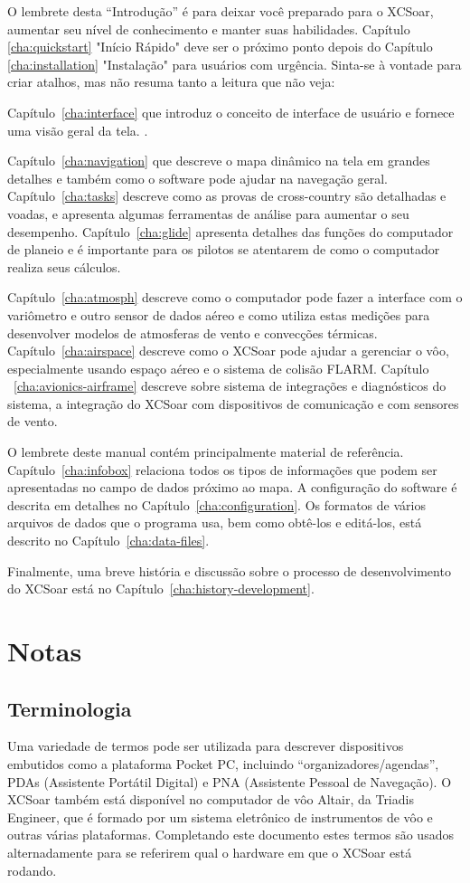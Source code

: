 O lembrete desta “Introdução” é para deixar você preparado para o XCSoar, aumentar seu nível de conhecimento e manter suas habilidades.   
Capítulo \ref{cha:quickstart} "Início Rápido" deve ser o próximo ponto depois do Capítulo 
\ref{cha:installation} "Instalação" para usuários com urgência. Sinta-se à vontade para criar atalhos, mas não resuma tanto a leitura que não veja:

Capítulo~\ref{cha:interface} que introduz o conceito de interface de usuário e fornece uma visão geral da tela. .

Capítulo~\ref{cha:navigation} que descreve o mapa dinâmico na tela em grandes detalhes e também como o software pode ajudar na navegação geral.  Capítulo~\ref{cha:tasks} descreve como as provas de cross-country são detalhadas e voadas, e apresenta algumas ferramentas de análise para aumentar o seu desempenho.
Capítulo~\ref{cha:glide} apresenta detalhes das funções do computador de planeio e é importante para os pilotos se atentarem de como o computador realiza seus cálculos.

Capítulo~\ref{cha:atmosph} descreve como o computador pode fazer a interface com o variômetro e outro sensor de dados aéreo e como utiliza estas medições para desenvolver modelos de atmosferas de vento e convecções térmicas.  
Capítulo~\ref{cha:airspace} descreve como o XCSoar pode ajudar a gerenciar o vôo, especialmente usando espaço aéreo e o sistema de colisão FLARM.  Capítulo ~\ref{cha:avionics-airframe} descreve sobre sistema de integrações e diagnósticos do sistema, a integração do XCSoar com dispositivos de comunicação e com sensores de vento.

O lembrete deste manual contém principalmente material de referência.  
Capítulo~\ref{cha:infobox} relaciona todos os tipos de informações que podem ser apresentadas no campo de dados próximo ao mapa.  A configuração do software é descrita em detalhes no
Capítulo~\ref{cha:configuration}.  Os formatos de vários arquivos de dados que o programa usa, bem como obtê-los e editá-los, está descrito no Capítulo~\ref{cha:data-files}.

Finalmente, uma breve história e discussão sobre o processo de desenvolvimento do XCSoar está no Capítulo~\ref{cha:history-development}.

\section{Notas}

\subsection*{Terminologia}
Uma variedade de termos pode ser utilizada para descrever dispositivos embutidos como a plataforma Pocket PC, incluindo “organizadores/agendas”,   PDAs (Assistente Portátil Digital) e PNA (Assistente Pessoal de Navegação).  O XCSoar também está disponível no computador de vôo Altair, da Triadis Engineer, que é formado por um sistema eletrônico de instrumentos de vôo e outras várias plataformas.  
Completando este documento estes termos são usados alternadamente para se referirem qual o hardware em que o XCSoar está rodando.


